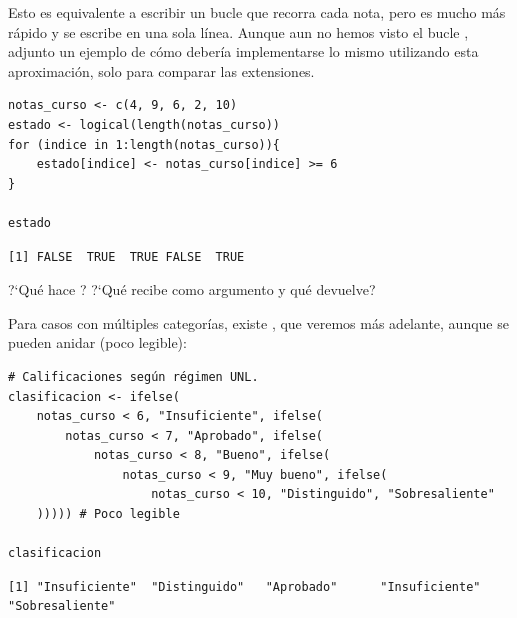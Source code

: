 \documentclass[8pt]{beamer}
\begin{document}
\begin{frame}[fragile]
	Esto es equivalente a escribir un bucle  que recorra cada nota, pero es mucho más rápido y se escribe en una sola línea. Aunque aun no hemos visto el bucle , adjunto un ejemplo de cómo debería implementarse lo mismo utilizando esta aproximación, solo para comparar las extensiones.
\begin{lstlisting}[style=RScript]
notas_curso <- c(4, 9, 6, 2, 10)
estado <- logical(length(notas_curso))
for (indice in 1:length(notas_curso)){
	estado[indice] <- notas_curso[indice] >= 6
}

estado	
\end{lstlisting}
\begin{lstlisting}[style=RConsole]
[1] FALSE  TRUE  TRUE FALSE  TRUE	
\end{lstlisting}

\begin{block}{}
	?`Qu\'e hace ? ?`Qu\'e recibe como argumento y qu\'e devuelve?
\end{block}
\end{frame}




\begin{frame}[fragile]
Para casos con múltiples categorías, existe , que veremos más adelante, aunque se pueden anidar  (poco legible):
\begin{lstlisting}[style=RScript]
# Calificaciones según régimen UNL.
clasificacion <- ifelse(
	notas_curso < 6, "Insuficiente", ifelse(
		notas_curso < 7, "Aprobado", ifelse(
			notas_curso < 8, "Bueno", ifelse(
				notas_curso < 9, "Muy bueno", ifelse(
					notas_curso < 10, "Distinguido", "Sobresaliente"
	))))) # Poco legible
	
clasificacion	
\end{lstlisting}
\begin{lstlisting}[style=RConsole]
[1] "Insuficiente"  "Distinguido"   "Aprobado"      "Insuficiente"  "Sobresaliente"
\end{lstlisting}
\end{frame}
\end{document}
